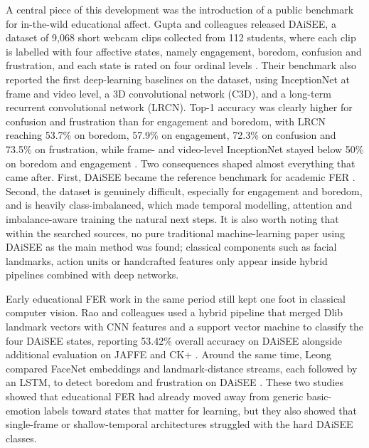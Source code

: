 A central piece of this development was the introduction of a public benchmark for in-the-wild educational affect. Gupta and colleagues released \ac{DAiSEE}, a dataset of 9{,}068 short webcam clips collected from 112 students, where each clip is labelled with four affective states, namely engagement, boredom, confusion and frustration, and each state is rated on four ordinal levels \cite{gupta_daisee_2016}. Their benchmark also reported the first deep-learning baselines on the dataset, using InceptionNet at frame and video level, a 3D convolutional network (C3D), and a long-term recurrent convolutional network (LRCN). Top-1 accuracy was clearly higher for confusion and frustration than for engagement and boredom, with LRCN reaching 53.7\% on boredom, 57.9\% on engagement, 72.3\% on confusion and 73.5\% on frustration, while frame- and video-level InceptionNet stayed below 50\% on boredom and engagement \cite{gupta_daisee_2016}. Two consequences shaped almost everything that came after. First, \ac{DAiSEE} became the reference benchmark for academic \ac{FER} \cite{lek_academic_2023}. Second, the dataset is genuinely difficult, especially for engagement and boredom, and is heavily class-imbalanced, which made temporal modelling, attention and imbalance-aware training the natural next steps. It is also worth noting that within the searched sources, no pure traditional machine-learning paper using \ac{DAiSEE} as the main method was found; classical components such as facial landmarks, action units or handcrafted features only appear inside hybrid pipelines combined with deep networks.

Early educational \ac{FER} work in the same period still kept one foot in classical computer vision. Rao and colleagues used a hybrid pipeline that merged Dlib landmark vectors with \ac{CNN} features and a support vector machine to classify the four \ac{DAiSEE} states, reporting 53.42\% overall accuracy on \ac{DAiSEE} alongside additional evaluation on JAFFE and CK+ \cite{rao_recognition_2021}. Around the same time, Leong compared FaceNet embeddings and landmark-distance streams, each followed by an \ac{LSTM}, to detect boredom and frustration on \ac{DAiSEE} \cite{leong_deep_2020}. These two studies showed that educational \ac{FER} had already moved away from generic basic-emotion labels toward states that matter for learning, but they also showed that single-frame or shallow-temporal architectures struggled with the hard \ac{DAiSEE} classes.

